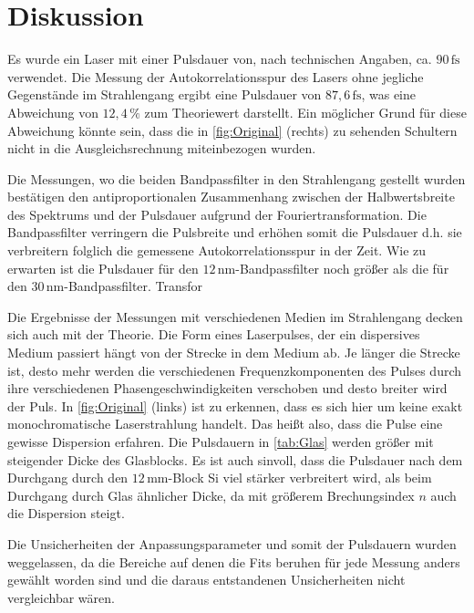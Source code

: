 \newpage
\section{Diskussion}
\label{sec:disskussion}

Es wurde ein Laser mit einer Pulsdauer von, nach technischen Angaben, ca. $90\,\si{\femto\second}$ verwendet.
Die Messung der Autokorrelationsspur des Lasers ohne jegliche Gegenstände im Strahlengang ergibt eine Pulsdauer von $87,6\,\si{\femto\second}$, was eine Abweichung von $12,4\,\%$ zum Theoriewert darstellt.
Ein möglicher Grund für diese Abweichung könnte sein, dass die in \autoref{fig:Original} (rechts) zu sehenden Schultern nicht in die Ausgleichsrechnung miteinbezogen wurden.

Die Messungen, wo die beiden Bandpassfilter in den Strahlengang gestellt wurden bestätigen den antiproportionalen Zusammenhang zwischen der Halbwertsbreite des Spektrums und der Pulsdauer aufgrund der Fouriertransformation.
Die Bandpassfilter verringern die Pulsbreite und erhöhen somit die Pulsdauer d.h. sie verbreitern folglich die gemessene Autokorrelationsspur in der Zeit.
Wie zu erwarten ist die Pulsdauer für den $12\,\si{\nano\meter}$-Bandpassfilter noch größer als die für den $30\,\si{\nano\meter}$-Bandpassfilter.
Transfor

Die Ergebnisse der Messungen mit verschiedenen Medien im Strahlengang decken sich auch mit der Theorie.
Die Form eines Laserpulses, der ein dispersives Medium passiert hängt von der Strecke in dem Medium ab.
Je länger die Strecke ist, desto mehr werden die verschiedenen Frequenzkomponenten des Pulses durch ihre verschiedenen Phasengeschwindigkeiten verschoben und desto breiter wird der Puls.
In \autoref{fig:Original} (links) ist zu erkennen, dass es sich hier um keine exakt monochromatische Laserstrahlung handelt.
Das heißt also, dass die Pulse eine gewisse Dispersion erfahren.
Die Pulsdauern in \autoref{tab:Glas} werden größer mit steigender Dicke des Glasblocks.
Es ist auch sinvoll, dass die Pulsdauer nach dem Durchgang durch den $12\,\si{\milli\meter}$-Block Si viel stärker verbreitert wird, als beim Durchgang durch Glas ähnlicher Dicke, da mit größerem Brechungsindex $n$ auch die Dispersion steigt.

Die Unsicherheiten der Anpassungsparameter und somit der Pulsdauern wurden weggelassen, da die Bereiche auf denen die Fits beruhen für jede Messung anders gewählt worden sind und die daraus entstandenen Unsicherheiten nicht vergleichbar wären.


